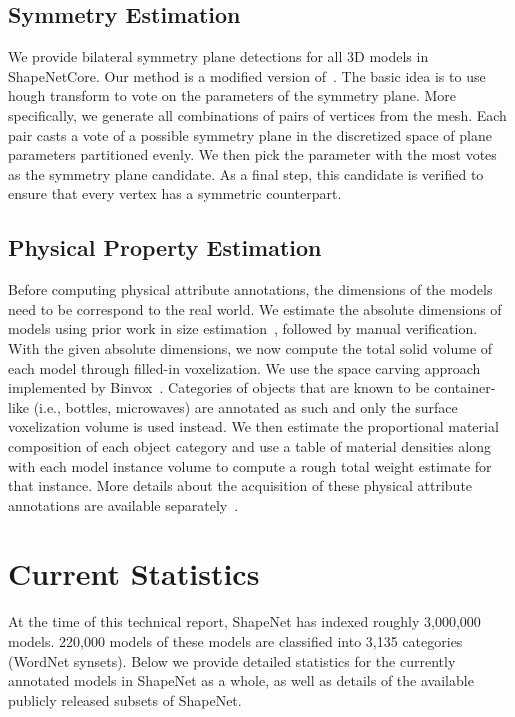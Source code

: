 \subsection{Symmetry Estimation}
We provide bilateral symmetry plane detections for all 3D models in ShapeNetCore. Our method is a modified version of~\cite{mitra:2013:symmetry}. The basic idea is to use hough transform to vote on the parameters of the symmetry plane. More specifically, we generate all combinations of pairs of vertices from the mesh. Each pair casts a vote of a possible symmetry plane in the discretized space of plane parameters partitioned evenly. We then pick the parameter with the most votes as the symmetry plane candidate. As a final step, this candidate is verified to ensure that every vertex has a symmetric counterpart.\label{sec:symmetry}

\subsection{Physical Property Estimation}
Before computing physical attribute annotations, the dimensions of the models need to be correspond to the real world.  We estimate the absolute dimensions of models using prior work in size estimation~\cite{savva:2014:sizes}, followed by manual verification.  With the given absolute dimensions, we now compute the total solid volume of each model through filled-in voxelization.  We use the space carving approach implemented by Binvox~\cite{nooruddin:2003:simplification}.  Categories of objects that are known to be container-like (i.e., bottles, microwaves) are annotated as such and only the surface voxelization volume is used instead.  We then estimate the proportional material composition of each object category and use a table of material densities along with each model instance volume to compute a rough total weight estimate for that instance.  More details about the acquisition of these physical attribute annotations are available separately~\cite{savva:2015:semgeo}. \label{sec:physical}

\section{Current Statistics}
\label{sec:statistics}
At the time of this technical report, ShapeNet has indexed roughly 3,000,000 models. 220,000 models of these models are classified into 3,135 categories (WordNet synsets). Below we provide detailed statistics for the currently annotated models in ShapeNet as a whole, as well as details of the available publicly released subsets of ShapeNet.

